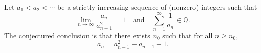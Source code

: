 Let $a_1<a_2<\cdots$ be a strictly increasing sequence of (nonzero) integers such that
\[
\lim_{n\to\infty}\frac{a_n}{a_{n-1}^2}=1
\quad\text{and}\quad
\sum_{n=1}^{\infty}\frac{1}{a_n}\in\mathbb{Q}.
\]
The conjectured conclusion is that there exists $n_0$ such that for all $n\ge n_0$,
\[
 a_n=a_{n-1}^2-a_{n-1}+1.
\]

